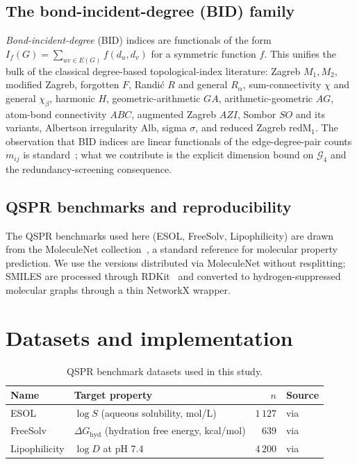 \documentclass[11pt,a4paper]{article}
\theoremstyle{definition}
\begin{document}
\subsection{The bond-incident-degree (BID) family}

\emph{Bond-incident-degree} (BID) indices are functionals of the
form $I_f(G)=\sum_{uv\in E(G)} f(d_u,d_v)$ for a symmetric
function $f$. This unifies the bulk of the classical degree-based
topological-index literature: Zagreb $M_1,M_2$, modified Zagreb,
forgotten $F$, Randi\'c $R$ and general $R_\alpha$,
sum-connectivity $\chi$ and general $\chi_\beta$, harmonic $H$,
geometric-arithmetic $GA$, arithmetic-geometric $AG$, atom-bond
connectivity $ABC$, augmented Zagreb $AZI$, Sombor $SO$ and its
variants, Albertson irregularity $\mathrm{Alb}$, sigma $\sigma$,
and reduced Zagreb $\mathrm{redM}_1$. The observation that BID
indices are linear functionals of the edge-degree-pair counts
$m_{ij}$ is standard~\cite{GutmanBorovicanin2018BID}; what we
contribute is the explicit dimension bound on $\mathcal{G}_4$ and
the redundancy-screening consequence.

\subsection{QSPR benchmarks and reproducibility}

The QSPR benchmarks used here (ESOL, FreeSolv, Lipophilicity) are
drawn from the MoleculeNet collection~\cite{MoleculeNet}, a
standard reference for molecular property prediction. We use the
versions distributed via MoleculeNet without resplitting; SMILES
are processed through RDKit~\cite{RDKit} and converted to
hydrogen-suppressed molecular graphs through a thin NetworkX
wrapper.

\section{Datasets and implementation}\label{sec:datasets}

\begin{table}[h]
\centering
\caption{QSPR benchmark datasets used in this study.}
\label{tab:datasets}
\begin{tabular}{llrl}
\toprule
Name & Target property & $n$ & Source\\
\midrule
ESOL          & $\log S$ (aqueous solubility, mol/L) & $1\,127$ & \cite{Delaney2004ESOL} via \cite{MoleculeNet}\\
FreeSolv      & $\Delta G_{\mathrm{hyd}}$ (hydration free energy, kcal/mol) & $639$ & \cite{Mobley2014FreeSolv} via \cite{MoleculeNet}\\
Lipophilicity & $\log D$ at pH 7.4 & $4\,200$ & \cite{LipophilicityChEMBL} via \cite{MoleculeNet}\\
\bottomrule
\end{tabular}
\end{table}
\end{document}
